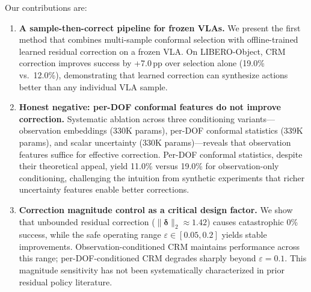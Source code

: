 Our contributions are:
\begin{enumerate}[leftmargin=*,nosep]
  \item \textbf{A sample-then-correct pipeline for frozen VLAs.}
  We present the first method that combines multi-sample conformal selection with offline-trained learned residual correction on a frozen VLA.
  On LIBERO-Object, CRM correction improves success by +7.0\,pp over selection alone (19.0\% vs.\ 12.0\%), demonstrating that learned correction can synthesize actions better than any individual VLA sample.

  \item \textbf{Honest negative: per-DOF conformal features do not improve correction.}
  Systematic ablation across three conditioning variants---observation embeddings (330K params), per-DOF conformal statistics (339K params), and scalar uncertainty (330K params)---reveals that observation features suffice for effective correction.
  Per-DOF conformal statistics, despite their theoretical appeal, yield 11.0\% versus 19.0\% for observation-only conditioning, challenging the intuition from synthetic experiments that richer uncertainty features enable better corrections.

  \item \textbf{Correction magnitude control as a critical design factor.}
  We show that unbounded residual correction ($\|\boldsymbol{\delta}\|_2 \approx 1.42$) causes catastrophic 0\% success, while the safe operating range $\varepsilon \in [0.05, 0.2]$ yields stable improvements.
  Observation-conditioned CRM maintains performance across this range; per-DOF-conditioned CRM degrades sharply beyond $\varepsilon = 0.1$.
  This magnitude sensitivity has not been systematically characterized in prior residual policy literature.
\end{enumerate}

